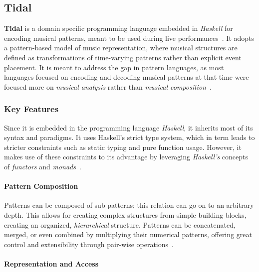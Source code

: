 \subsection{Tidal}\label{subsec:tidal}

\textbf{Tidal} is a domain specific programming language embedded in \textit{Haskell} for encoding musical patterns,
meant to be used during live performances~\cite{McLean_Wiggins_2010}.
It adopts a pattern-based model of music representation, where musical structures are defined as transformations of
time-varying patterns rather than explicit event placement.
It is meant to address the gap in pattern languages, as most languages focused on encoding and decoding musical patterns
at that time were focused more on \textit{musical analysis} rather than \textit{musical
composition}~\cite{McLean_Wiggins_2010}.


\subsubsection{Key Features}

Since it is embedded in the programming language \textit{Haskell}, it inherits most of its syntax and paradigms.
It uses Haskell's strict type system, which in term leads to stricter constraints such as static typing and pure
function usage.
However, it makes use of these constraints to its advantage by leveraging \textit{Haskell's} concepts of
\textit{functors} and \textit{monads}~\cite{McLean_Wiggins_2010}.

\paragraph{Pattern Composition}

Patterns can be composed of sub-patterns; this relation can go on to an arbitrary depth.
This allows for creating complex structures from simple building blocks, creating an organized, \textit{hierarchical}
structure.
Patterns can be concatenated, merged, or even combined by multiplying their numerical patterns, offering great control
and extensibility through pair-wise operations~\cite{McLean_Wiggins_2010}.

\paragraph{Representation and Access}

